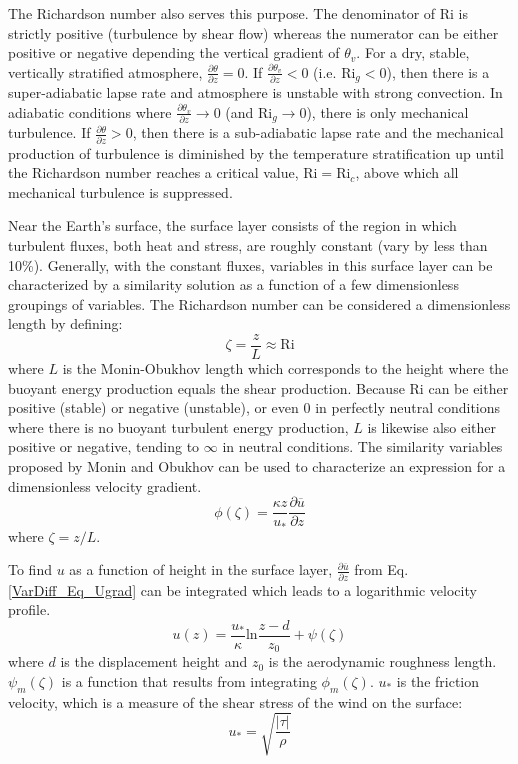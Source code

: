 The Richardson number also serves this purpose.
The denominator of $\mathrm{Ri}$ is strictly positive (turbulence by shear flow) whereas the numerator can be either
positive or negative depending the vertical gradient of $\theta_v$. For a dry, stable, vertically
stratified atmosphere, $\frac{\partial \theta}{\partial z}=0$.
If $\frac{\partial \theta_v}{\partial z}<0$ (i.e. $\mathrm{Ri}_g<0$), then there is a super-adiabatic lapse rate
and atmosphere is unstable with strong convection. In adiabatic conditions where
$\frac{\partial \theta_v}{\partial z} \rightarrow 0$ (and $\mathrm{Ri}_g \rightarrow 0$),
there is only mechanical turbulence. If $\frac{\partial \theta}{\partial z}>0$, then there
is a sub-adiabatic lapse rate and the mechanical production of turbulence is diminished by
the temperature stratification up until the Richardson number reaches a critical value,
$\mathrm{Ri} = \mathrm{Ri}_c$, above which all mechanical turbulence is suppressed.

Near the Earth's surface, the surface layer consists of the region in which turbulent fluxes,
both heat and stress, are roughly constant (vary by less than 10\%). Generally, with the constant
fluxes, variables in this surface layer can be characterized by a similarity solution as a function
of a few dimensionless groupings of variables. The Richardson number can be considered a dimensionless
length by defining:
\begin{equation}\label{VarDiff_Eq_ScaleHeight}
\zeta = \frac{z}{L} \approx \mathrm{Ri}
\end{equation}
where $L$ is the Monin-Obukhov length which corresponds to the height where the buoyant energy production
equals the shear production. Because $\mathrm{Ri}$ can be either positive (stable) or negative (unstable), or
even 0 in perfectly neutral conditions where there is no buoyant turbulent energy production, $L$ is likewise
also either positive or negative, tending to $\infty$ in neutral conditions. 
The similarity variables proposed by Monin and Obukhov can be used to characterize an expression for 
a dimensionless velocity gradient.
\begin{equation}\label{VarDiff_Eq_Ugrad}
\phi(\zeta) = \frac{\kappa z}{u_*} \frac{\partial \overline{u}}{\partial z}  %
\end{equation}
where $\zeta = z/L$.

To find $u$ as a function of height in the surface layer, $\frac{\partial \overline{u}}{\partial z}$
from Eq. \ref{VarDiff_Eq_Ugrad} can be integrated
which leads to a logarithmic velocity profile.
\begin{equation}\label{VarDiff_Eq_Ulog}
u(z) = \frac{u_{*}}{\kappa} \mathrm{ln} \frac{z-d}{z_0} + \psi (\zeta)
\end{equation}
where $d$ is the displacement height and $z_0$ is the aerodynamic roughness length. $\psi_m(\zeta)$ is
a function that results from integrating $\phi_m(\zeta)$.
$u_{*}$ is the friction velocity, which is a measure of the shear stress of the wind on the surface:
\begin{equation}\label{VarDiff_Eq_Ustar}
u_{*} = \sqrt{\frac{|\tau|}{\rho}}
\end{equation}

